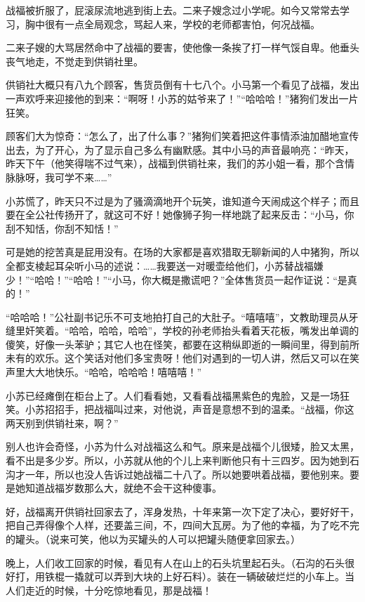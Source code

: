战福被折服了，屁滚尿流地逃到街上去。二来子嫂念过小学呢。如今又常常去学习，胸中很有一点全局观念，骂起人来，学校的老师都害怕，何况战福。 

二来子嫂的大骂居然命中了战福的要害，使他像一条挨了打一样气馁自卑。他垂头丧气地走，不觉走到供销社里。 

供销社大概只有八九个顾客，售货员倒有十七八个。小马第一个看见了战福，发出一声欢呼来迎接他的到来：“啊呀！小苏的姑爷来了！”“哈哈哈！”猪狗们发出一片狂笑。 

顾客们大为惊奇：“怎么了，出了什么事？”猪狗们笑着把这件事情添油加醋地宣传出去，为了开心，为了显示自己多么有幽默感。其中小马的声音最响亮：“昨天，昨天下午（他笑得喘不过气来），战福到供销社来，我们的苏小姐一看，那个含情脉脉呀，我可学不来……” 

小苏慌了，昨天只不过是为了骚滴滴地开个玩笑，谁知道今天闹成这个样子；而且要在全公社传扬开了，就这可不好！她像狮子狗一样地跳了起来反击：“小马，你刮不知恬，你刮不知恬！” 

可是她的挖苦真是屁用没有。在场的大家都是喜欢猎取无聊新闻的人中猪狗，所以全都支棱起耳朵听小马的述说：……我要送一对暖壶给他们，小苏替战福嫌少！”“哈哈！”“哈哈！”“小马，你大概是撒谎吧？”全体售货员一起作证说：“是真的！” 

“哈哈哈！”公社副书记乐不可支地拍打自己的大肚子。“嘻嘻嘻”，文教助理员从牙缝里奸笑着。“哈哈，哈哈，哈哈”，学校的孙老师抬头看着天花板，嘴发出单调的傻笑，好像一头苯驴；其它人也在怪笑，都要在这稍纵即逝的一瞬间里，得到前所未有的欢乐。这个笑话对他们多宝贵呀！他们对遇到的一切人讲，然后又可以在笑声里大大地快乐。“哈哈，哈哈哈！嘻嘻嘻！” 

小苏已经瘫倒在柜台上了。人们看看她，又看看战福黑紫色的鬼脸，又是一场狂笑。小苏招招手，把战福叫过来，对他说，声音是意想不到的温柔。“战福，你这两天别到供销社来，啊？” 

别人也许会奇怪，小苏为什么对战福这么和气。原来是战福个儿很矮，脸又太黑，看不出是多少岁。所以，小苏就从他的个儿上来判断他只有十三四岁。因为她到石沟才一年，所以也没人告诉过她战福二十八了。所以她要哄着战福，要他别来。要是她知道战福岁数那么大，就绝不会干这种傻事。 

好，战福离开供销社回家去了，浑身发热，十年来第一次下定了决心，要好好干，把自己弄得像个人样，还要盖三间，不，四间大瓦房。为了他的幸福，为了吃不完的罐头。（说来可笑，他以为买罐头的人可以把罐头随便拿回家去。） 

晚上，人们收工回家的时候，看见有人在山上的石头坑里起石头。（石沟的石头很好打，用铁棍一撬就可以弄到大块的上好石料）。装在一辆破破烂烂的小车上。当人们走近的时候，十分吃惊地看见，那是战福！ 

